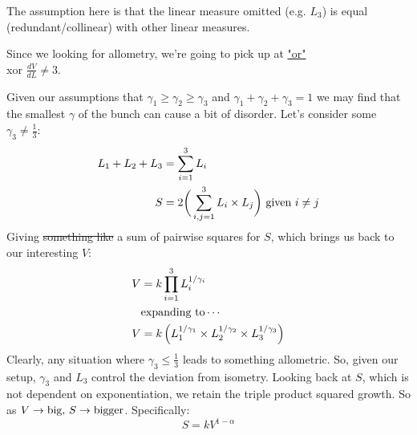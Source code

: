 \begin{enumerate}
The assumption here is that the linear measure omitted
(e.g. $L_3$)
is equal (redundant/collinear) with other linear measures.

Since we looking for allometry,
we're going to pick up at \hyperlink{allometric}{"or"}\\
\tiny
xor $\frac{dV}{dL} \neq 3$.
\normalsize

Given our assumptions that
$\gamma_1 \geq \gamma_2 \geq \gamma_3$
and $\gamma_1 + \gamma_2 +\gamma_3 = 1$
we may find that the smallest $\gamma$ of the bunch can cause a bit of disorder.
Let's consider some $\gamma_3 \neq \frac{1}{3}$:
\begin{align*}
    L_1 + L_2 + L_3 &= \sum_{i=1}^3 L_i\\
    S &= 
    2 \bigg(
    \sum_{i, j = 1}^{3} L_i \times L_j
    \bigg) \textnormal{ given }i \neq j
\end{align*}
Giving \sout{something like} a sum of pairwise squares for $S$,
which brings us back to our interesting $V$:
\begin{align*}
    V &= k \prod_{i=1}^{3} {L_{i}^{1/\gamma_i}}\\
    &\textnormal{expanding to}\cdots\\
    V &= k  \left( 
            {L_{1}^{1/\gamma_1}}
            \times
            {L_{2}^{1/\gamma_2}}
            \times
            {L_{3}^{1/\gamma_3}}
            \right)
\end{align*}
Clearly,
any situation where $\gamma_3 \leq \frac{1}{3}$ leads to something allometric.
So, given our setup, $\gamma_3$ and $L_3$ control the deviation from isometry.
Looking back at $S$, which is not dependent on exponentiation, we retain the triple product squared growth.
So as $V \to \textnormal{big, } S \to \textnormal{bigger}$.
Specifically:
$$
S = k V^{1-\alpha}
$$

\clearpage


\end{enumerate}
